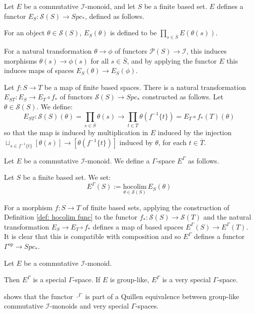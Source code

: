 \documentclass{TPmod}
\newcommand{\hocolim}{\mathrm{hocolim}}
\newcommand{\cI}{\mathcal{I}}
\newcommand{\cP}{\mathcal{P}}
\newcommand{\cS}{\mathcal{S}}
\numberwithin{equation}{section}
\begin{document}
    \begin{defn}\label{def: sS cat}
        Let $E$ be a commutative $\cI$-monoid, and let $S$ be a finite based set. $E$ defines a functor $E_S: \cS(S) \to Spc_*$, defined as follows.

        For an object $\theta \in \cS(S)$, $E_S(\theta)$ is defined to be $\prod_{s \in \overline S} E\left(\theta(s)\right)$.

        For a natural transformation $\theta \to \phi$ of functors $\cP(S) \to \cI$, this induces morphisms $\theta(s) \to \phi(s)$ for all $s \in \overline S$, and by applying the functor $E$ this induces maps of spaces $E_S(\theta) \to E_S(\phi)$.

        Let $f: S \to T$ be a map of finite based spaces. There is a natural transformation $E_{ST}: E_S \to E_T \circ f_*$ of functors $\cS(S) \to Spc_*$ constructed as follows. Let $\theta \in \cS(S)$. We define:
        \begin{equation}
            E_{ST}: \cS(S)(\theta) = \prod\limits_{s \in \overline S} \theta(s) \to \prod\limits_{t \in \overline T} \theta(f^{-1}\{t\}) = E_T\circ f_*(T)(\theta)
        \end{equation}
        so that the map is induced by multiplication in $E$ induced by the injection $\sqcup_{s \in f^{-1}\{t\}}[\theta(s)] \to [\theta(f^{-1}\{t\})]$ induced by $\theta$, for each $t \in \overline T$.

    \end{defn}
    \begin{defn}\label{def: Gam spc from I mon}
        Let $E$ be a commutative $\cI$-monoid. We define a $\Gamma$-space $E^\Gamma$ as follows.

        Let $S$ be a finite based set. We set:
        \begin{equation}
            E^\Gamma(S) := \underset{\theta \in \cS(S)}{\hocolim}\, E_S(\theta)
        \end{equation}

        For a morphism $f: S \to T$ of finite based sets, applying the construction of Definition \ref{def: hocolim func} to the functor $f_*: \cS(S) \to \cS(T)$ and the natural transformation $E_S \to E_T \circ f_*$ defines a map of based spaces $E^{\Gamma}(S) \to E^\Gamma(T)$. It is clear that this is compatible with composition and so $E^\Gamma$ defines a functor $\Gamma^{op} \to Spc_*$.
    \end{defn}
    \begin{lem}
        Let $E$ be a commutative $\cI$-monoid.

        Then $E^\Gamma$ is a special $\Gamma$-space. If $E$ is group-like, $E^\Gamma$ is a very special $\Gamma$-space.
    \end{lem}
    \begin{rmk}
        \cite{Sagave-Schlichtkrull:Diagram} shows that the functor $\cdot^\Gamma$ is part of a Quillen equivalence between group-like commutative $\cI$-monoids and very special $\Gamma$-spaces.
    \end{rmk}
\end{document}
